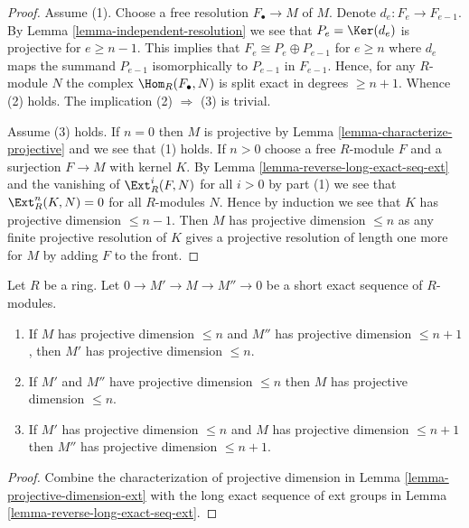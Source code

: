 \begin{proof}
Assume (1). Choose a free resolution $F_\bullet \to M$ of $M$. Denote
$d_e : F_e \to F_{e - 1}$. By
Lemma \ref{lemma-independent-resolution}
we see that $P_e = \Ker(d_e)$ is projective for $e \geq n - 1$.
This implies that $F_e \cong P_e \oplus P_{e - 1}$ for $e \geq n$
where $d_e$ maps the summand $P_{e - 1}$ isomorphically to $P_{e - 1}$
in $F_{e - 1}$. Hence, for any $R$-module $N$ the complex
$\Hom_R(F_\bullet, N)$ is split exact in degrees $\geq n + 1$.
Whence (2) holds. The implication (2) $\Rightarrow$ (3) is trivial.

\medskip\noindent
Assume (3) holds. If $n = 0$ then $M$ is projective by
Lemma \ref{lemma-characterize-projective}
and we see that (1) holds. If $n > 0$ choose a free $R$-module $F$
and a surjection $F \to M$ with kernel $K$. By
Lemma \ref{lemma-reverse-long-exact-seq-ext}
and the vanishing of $\Ext_R^i(F, N)$ for all $i > 0$ by part (1)
we see that $\Ext_R^n(K, N) = 0$ for all $R$-modules $N$.
Hence by induction we see that $K$ has projective dimension $\leq n - 1$.
Then $M$ has projective dimension $\leq n$ as any finite projective
resolution of $K$ gives a projective resolution of length one more
for $M$ by adding $F$ to the front.
\end{proof}

\begin{lemma}
\label{lemma-exact-sequence-projective-dimension}
Let $R$ be a ring. Let $0 \to M' \to M \to M'' \to 0$ be a short
exact sequence of $R$-modules.
\begin{enumerate}
\item If $M$ has projective dimension $\leq n$ and $M''$
has projective dimension $\leq n + 1$, then $M'$ has projective
dimension $\leq n$.
\item If $M'$ and $M''$ have projective dimension
$\leq n$ then $M$ has projective dimension $\leq n$.
\item If $M'$ has projective dimension $\leq n$ and
$M$ has projective dimension $\leq n + 1$ then
$M''$ has projective dimension $\leq n + 1$.
\end{enumerate}
\end{lemma}

\begin{proof}
Combine the characterization of projective dimension in
Lemma \ref{lemma-projective-dimension-ext}
with the long exact sequence of ext groups in
Lemma \ref{lemma-reverse-long-exact-seq-ext}.
\end{proof}

